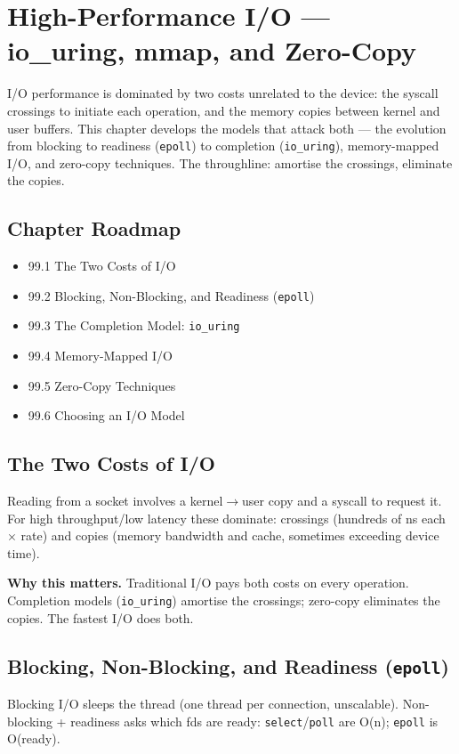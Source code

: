 \chapter{High-Performance I/O --- io\_uring, mmap, and Zero-Copy}

I/O performance is dominated by two costs unrelated to the device: the syscall crossings to initiate each operation, and the memory copies between kernel and user buffers. This chapter develops the models that attack both --- the evolution from blocking to readiness (\texttt{epoll}) to completion (\texttt{io\_uring}), memory-mapped I/O, and zero-copy techniques. The throughline: amortise the crossings, eliminate the copies.

\section*{Chapter Roadmap}
\begin{itemize}
\item 99.1 The Two Costs of I/O
\item 99.2 Blocking, Non-Blocking, and Readiness (\texttt{epoll})
\item 99.3 The Completion Model: \texttt{io\_uring}
\item 99.4 Memory-Mapped I/O
\item 99.5 Zero-Copy Techniques
\item 99.6 Choosing an I/O Model
\end{itemize}

\section{The Two Costs of I/O}
Reading from a socket involves a kernel$\to$user copy and a syscall to request it. For high throughput/low latency these dominate: crossings (hundreds of ns each $\times$ rate) and copies (memory bandwidth and cache, sometimes exceeding device time).

\textbf{Why this matters.} Traditional I/O pays both costs on every operation. Completion models (\texttt{io\_uring}) amortise the crossings; zero-copy eliminates the copies. The fastest I/O does both.

\section{Blocking, Non-Blocking, and Readiness (\texttt{epoll})}
Blocking I/O sleeps the thread (one thread per connection, unscalable). Non-blocking + readiness asks which fds are ready: \texttt{select}/\texttt{poll} are O(n); \texttt{epoll} is O(ready).


